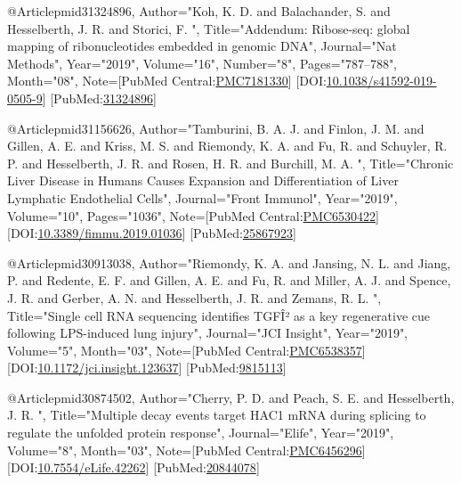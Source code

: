 @Article{pmid31324896,
   Author="Koh, K. D.  and Balachander, S.  and Hesselberth, J. R.  and Storici, F. ",
   Title="{{A}ddendum: {R}ibose-seq: global mapping of ribonucleotides embedded in genomic {D}{N}{A}}",
   Journal="Nat Methods",
   Year="2019",
   Volume="16",
   Number="8",
   Pages="787--788",
   Month="08",
   Note={[PubMed Central:\href{https://www.ncbi.nlm.nih.gov/pmc/articles/PMC7181330}{PMC7181330}] [DOI:\href{https://dx.doi.org/10.1038/s41592-019-0505-9}{10.1038/s41592-019-0505-9}] [PubMed:\href{https://www.ncbi.nlm.nih.gov/pubmed/31324896}{31324896}] }
}

@Article{pmid31156626,
   Author="Tamburini, B. A. J.  and Finlon, J. M.  and Gillen, A. E.  and Kriss, M. S.  and Riemondy, K. A.  and Fu, R.  and Schuyler, R. P.  and Hesselberth, J. R.  and Rosen, H. R.  and Burchill, M. A. ",
   Title="{{C}hronic {L}iver {D}isease in {H}umans {C}auses {E}xpansion and {D}ifferentiation of {L}iver {L}ymphatic {E}ndothelial {C}ells}",
   Journal="Front Immunol",
   Year="2019",
   Volume="10",
   Pages="1036",
   Note={[PubMed Central:\href{https://www.ncbi.nlm.nih.gov/pmc/articles/PMC6530422}{PMC6530422}] [DOI:\href{https://dx.doi.org/10.3389/fimmu.2019.01036}{10.3389/fimmu.2019.01036}] [PubMed:\href{https://www.ncbi.nlm.nih.gov/pubmed/25867923}{25867923}] }
}

@Article{pmid30913038,
   Author="Riemondy, K. A.  and Jansing, N. L.  and Jiang, P.  and Redente, E. F.  and Gillen, A. E.  and Fu, R.  and Miller, A. J.  and Spence, J. R.  and Gerber, A. N.  and Hesselberth, J. R.  and Zemans, R. L. ",
   Title="{{S}ingle cell {R}{N}{A} sequencing identifies {T}{G}{F}Î² as a key regenerative cue following {L}{P}{S}-induced lung injury}",
   Journal="JCI Insight",
   Year="2019",
   Volume="5",
   Month="03",
   Note={[PubMed Central:\href{https://www.ncbi.nlm.nih.gov/pmc/articles/PMC6538357}{PMC6538357}] [DOI:\href{https://dx.doi.org/10.1172/jci.insight.123637}{10.1172/jci.insight.123637}] [PubMed:\href{https://www.ncbi.nlm.nih.gov/pubmed/9815113}{9815113}] }
}

@Article{pmid30874502,
   Author="Cherry, P. D.  and Peach, S. E.  and Hesselberth, J. R. ",
   Title="{{M}ultiple decay events target {H}{A}{C}1 m{R}{N}{A} during splicing to regulate the unfolded protein response}",
   Journal="Elife",
   Year="2019",
   Volume="8",
   Month="03",
   Note={[PubMed Central:\href{https://www.ncbi.nlm.nih.gov/pmc/articles/PMC6456296}{PMC6456296}] [DOI:\href{https://dx.doi.org/10.7554/eLife.42262}{10.7554/eLife.42262}] [PubMed:\href{https://www.ncbi.nlm.nih.gov/pubmed/20844078}{20844078}] }
}

